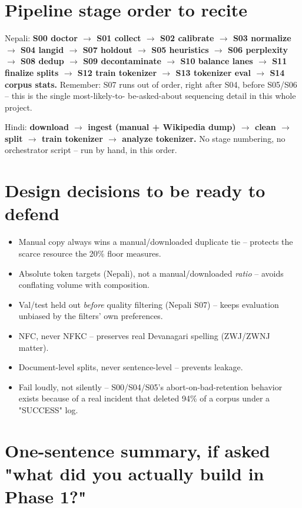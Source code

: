 \documentclass[11pt]{report}
\begin{document}
\section{Pipeline stage order to recite}

Nepali: \textbf{S00 doctor $\to$ S01 collect $\to$ S02 calibrate $\to$ S03
normalize $\to$ S04 langid $\to$ S07 holdout $\to$ S05 heuristics $\to$
S06 perplexity $\to$ S08 dedup $\to$ S09 decontaminate $\to$ S10 balance
lanes $\to$ S11 finalize splits $\to$ S12 train tokenizer $\to$ S13
tokenizer eval $\to$ S14 corpus stats.} Remember: S07 runs out of order,
right after S04, before S05/S06 -- this is the single most-likely-to-
be-asked-about sequencing detail in this whole project.

Hindi: \textbf{download $\to$ ingest (manual + Wikipedia dump) $\to$
clean $\to$ split $\to$ train tokenizer $\to$ analyze tokenizer.} No stage
numbering, no orchestrator script -- run by hand, in this order.

\section{Design decisions to be ready to defend}

\begin{itemize}[leftmargin=*]
\item Manual copy always wins a manual/downloaded duplicate tie --
protects the scarce resource the 20\% floor measures.
\item Absolute token targets (Nepali), not a manual/downloaded
\textit{ratio} -- avoids conflating volume with composition.
\item Val/test held out \textit{before} quality filtering (Nepali S07) --
keeps evaluation unbiased by the filters' own preferences.
\item NFC, never NFKC -- preserves real Devanagari spelling
(ZWJ/ZWNJ matter).
\item Document-level splits, never sentence-level -- prevents leakage.
\item Fail loudly, not silently -- S00/S04/S05's abort-on-bad-retention
behavior exists because of a real incident that deleted 94\% of a corpus
under a "SUCCESS" log.
\end{itemize}

\section{One-sentence summary, if asked "what did you actually build in
Phase 1?"}
\end{document}
